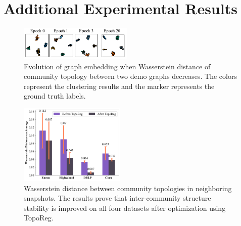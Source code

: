 \documentclass[letterpaper]{article} %
\begin{document}
\begin{table}[htbp]
\caption{Dataset summary}
\label{table.dataset}
\end{table}

\section{Additional Experimental Results}
\begin{figure}[htbp] %
\centering %
\includegraphics[width=0.48\textwidth]{pic/demo_emb_loss_v2.pdf} %
\caption{Evolution of graph embedding when Wasserstein distance of community topology between two demo graphs decreases. The colors represent the clustering results and the marker represents the ground truth labels.} %
\label{Fig.emb_loss_decrease} %
\end{figure}

\begin{figure}[]
\centering %
\includegraphics[width=0.45\textwidth]{pic/topo_improve.pdf} %
\caption{Wasserstein distance between community topologies in neighboring snapshots. The results prove that inter-community structure stability is improved on all four datasets after optimization using TopoReg.} %
\label{Fig.topoimprove} %
\end{figure}
\end{document}
